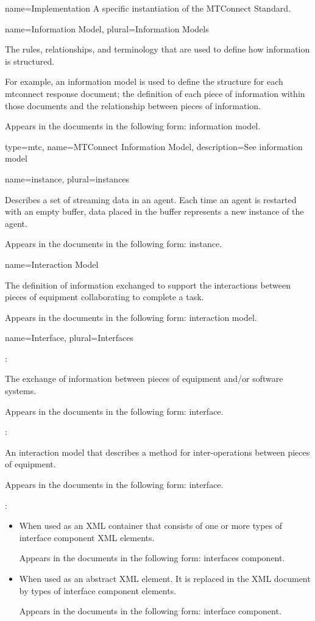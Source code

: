 {
  name={Implementation}
}
{
	A specific instantiation of the MTConnect Standard.
}


{
  name={Information Model},
  plural={Information Models}
}
{
	The rules, relationships, and terminology that are used to define how information is structured.

	For example, an information model is used to define the structure for each \gls{mtconnect response document}; the definition of each piece of information within those documents and the relationship between pieces of information.

	Appears in the documents in the following form: \gls{information model}.
}

{
  type=mtc,
  name={MTConnect Information Model},
  description={See \gls{information model}}
}

{
  name={instance},
  plural={instances}
}
{
	Describes a set of \gls{streaming data} in an \gls{agent}.  Each time an \gls{agent} is restarted with an empty \gls{buffer}, data placed in the \gls{buffer} represents a new \gls{instance} of the \gls{agent}.

	Appears in the documents in the following form: \gls{instance}.
}


{
  name={Interaction Model}
}
{
	The definition of information exchanged to support the interactions between pieces of equipment collaborating to complete a task.

	Appears in the documents in the following form: \gls{interaction model}.
}


{
  name={Interface},
  plural={Interfaces}
}
{
	:

	The exchange of information between pieces of equipment and/or software systems.

	Appears in the documents in the following form: interface.

	:

	An \gls{interaction model} that describes a method for inter-operations between pieces of equipment.

	Appears in the documents in the following form: \gls{interface}.

	:

    \begin{itemize}
	\item When used as an XML container that consists of one or more types of \gls{interface component} XML elements.

	Appears in the documents in the following form: \gls{interfaces component}.

	\item When used as an abstract XML element.  It is replaced in the XML document by types of \gls{interface component} elements.

	Appears in the documents in the following form: \gls{interface component}.
	\end{itemize}
}


